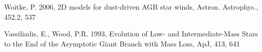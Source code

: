 \documentclass[a4paper,11pt,twocolumn]{article}
\newcommand{\fig}[1]{\centerline{\texttt{[image: \#1]}}}
\begin{document}
\begin{thebibliography}{9}
    Woitke, P. 2006, 2D models for dust-driven AGB star winds, Astron. Astrophys., 452.2, 537
    
    






    Vassiliadis, E., Wood, P.R. 1993, Evolution of Low- and Intermediate-Mass Stars to the End of the Asymptotic Giant Branch with Mass Loss, ApJ, 413, 641


\end{thebibliography}
\end{document}
